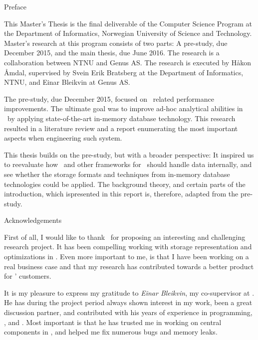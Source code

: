 {\Huge Preface}
\vspace{1cm}

This Master's Thesis is the final deliverable of the Computer Science Program at the Department of Informatics, Norwegian University of Science and Technology. Master's research at this program consists of two parts: A pre-study, due December 2015, and the main thesis, due June 2016. The research is a collaboration between NTNU and Genus AS. The research is executed by Håkon Åmdal, supervised by Svein Erik Bratsberg at the Department of Informatics, NTNU, and Einar Bleikvin at Genus AS.

The pre-study, due December 2015, focused on \bi~related performance improvements. The ultimate goal was to improve ad-hoc analytical abilities in \gap~by applying state-of-the-art in-memory database technology. This research resulted in a literature review and a report enumerating the most important aspects when engineering such system.

This thesis builds on the pre-study, but with a broader perspective: It inspired us to reevaluate how \gap~and other frameworks for \mde~should handle data internally, and see whether the storage formats and techniques from in-memory database technologies could be applied. The background theory, and certain parts of the introduction, which ispresented in this report is, therefore, adapted from the pre-study.

\vspace{1cm}

{\Large Acknowledgements}


First of all, I would like to thank \genus~for proposing an interesting and challenging research project. It has been compelling working with storage representation and optimizations in \gap. Even more important to me, is that I have been working on a real business case and that my research has contributed towards a better product for \genus' customers.

It is my pleasure to express my gratitude to \textit{Einar Bleikvin}, my co-supervisor at \genus. He has during the project period always shown interest in my work, been a great discussion partner, and contributed with his years of experience in programming, \delphi, and \gap. Most important is that he has trusted me in working on central components in \gap, and helped me fix numerous bugs and memory leaks.

